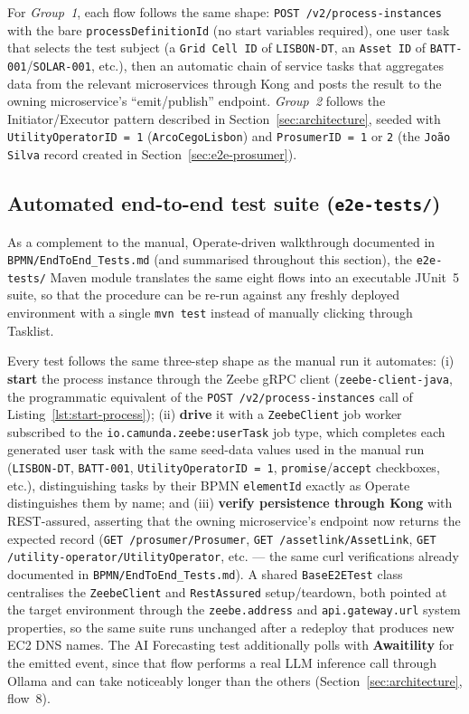\documentclass[11pt,a4paper]{article}
\begin{document}
\noindent
For \emph{Group~1}, each flow follows the same shape: \texttt{POST
/v2/process-instances} with the bare \texttt{processDefinitionId} (no start
variables required), one user task that selects the test subject (a
\texttt{Grid Cell ID} of \texttt{LISBON-DT}, an \texttt{Asset ID} of
\texttt{BATT-001}/\texttt{SOLAR-001}, etc.), then an automatic chain of
service tasks that aggregates data from the relevant microservices through
Kong and posts the result to the owning microservice's ``emit/publish''
endpoint. \emph{Group~2} follows the Initiator/Executor pattern described in
Section~\ref{sec:architecture}, seeded with \texttt{UtilityOperatorID = 1}
(\texttt{ArcoCegoLisbon}) and \texttt{ProsumerID = 1} or \texttt{2} (the
\texttt{Jo\~ao Silva} record created in Section~\ref{sec:e2e-prosumer}).

\subsection{Automated end-to-end test suite (\texttt{e2e-tests/})}
\label{sec:e2e-automation}

As a complement to the manual, Operate-driven walkthrough documented in
\texttt{BPMN/EndToEnd\_Tests.md} (and summarised throughout this section),
the \texttt{e2e-tests/} Maven module translates the same eight flows into an
executable JUnit~5 suite, so that the procedure can be re-run against any
freshly deployed environment with a single \texttt{mvn test} instead of
manually clicking through Tasklist.

\noindent
Every test follows the same three-step shape as the manual run it
automates: (i) \textbf{start} the process instance through the Zeebe gRPC
client (\texttt{zeebe-client-java}, the programmatic equivalent of the
\texttt{POST /v2/process-instances} call of Listing~\ref{lst:start-process});
(ii) \textbf{drive} it with a \texttt{ZeebeClient} job worker subscribed to
the \texttt{io.camunda.zeebe:userTask} job type, which completes each
generated user task with the same seed-data values used in the manual run
(\texttt{LISBON-DT}, \texttt{BATT-001}, \texttt{UtilityOperatorID = 1},
\texttt{promise}/\texttt{accept} checkboxes, etc.), distinguishing tasks by
their BPMN \texttt{elementId} exactly as Operate distinguishes them by name;
and (iii) \textbf{verify persistence through Kong} with REST-assured,
asserting that the owning microservice's endpoint now returns the expected
record (\texttt{GET /prosumer/Prosumer}, \texttt{GET /assetlink/AssetLink},
\texttt{GET /utility-operator/UtilityOperator}, etc. --- the same curl
verifications already documented in \texttt{BPMN/EndToEnd\_Tests.md}). A
shared \texttt{BaseE2ETest} class centralises the \texttt{ZeebeClient} and
\texttt{RestAssured} setup/teardown, both pointed at the target environment
through the \texttt{zeebe.address} and \texttt{api.gateway.url} system
properties, so the same suite runs unchanged after a redeploy that produces
new EC2 DNS names. The AI Forecasting test additionally polls with
\textbf{Awaitility} for the emitted event, since that flow performs a real
LLM inference call through Ollama and can take noticeably longer than the
others (Section~\ref{sec:architecture}, flow~8).
\end{document}
